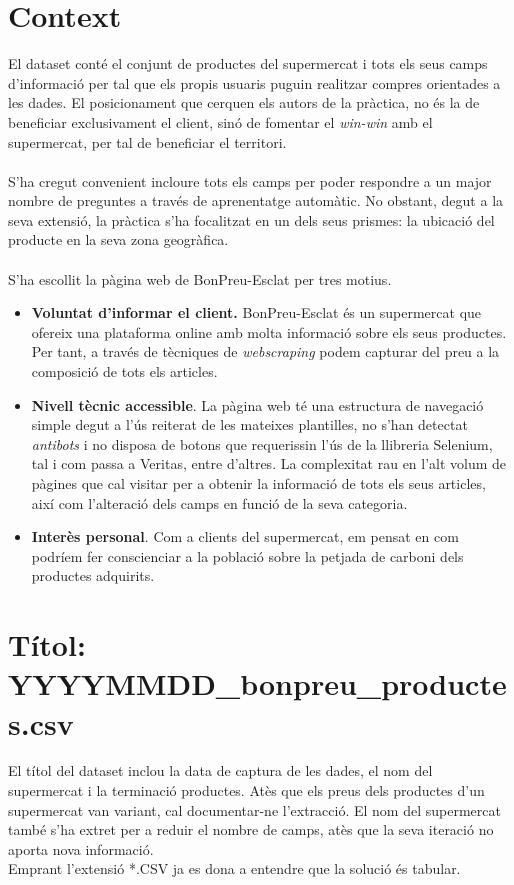 \documentclass[]{scrartcl}
\begin{document}
\section{Context}
El dataset conté el conjunt de productes del supermercat i tots els seus camps d'informació per tal que els propis usuaris puguin realitzar compres orientades a les dades. El posicionament que cerquen els autors de la pràctica, no és la de beneficiar exclusivament el client, sinó de fomentar el \textit{win-win} amb el supermercat, per tal de beneficiar el territori. 
\\\\S'ha cregut convenient incloure tots els camps per poder respondre a un major nombre de preguntes a través de aprenentatge automàtic. No obstant, degut a la seva extensió, la pràctica s'ha focalitzat en un dels seus prismes: la ubicació del producte en la seva zona geogràfica.
\\\\
S'ha escollit la pàgina web de BonPreu-Esclat per tres motius. 
\begin{itemize}
	\item \textbf{Voluntat d'informar el client.} BonPreu-Esclat és un supermercat que ofereix una plataforma online amb molta informació sobre els seus productes. Per tant, a través de tècniques de \textit{webscraping} podem capturar del preu a la composició de tots els articles.
	\item \textbf{Nivell tècnic accessible}. La pàgina web té una estructura de navegació simple degut a l'ús reiterat de les mateixes plantilles, no s'han detectat \textit{antibots} i no disposa de botons que requerissin l'ús de la llibreria Selenium, tal i com passa a Veritas, entre d'altres. La complexitat rau en l'alt volum de pàgines que cal visitar per a obtenir la informació de tots els seus articles, així com l'alteració dels camps en funció de la seva categoria.
	\item \textbf{Interès personal}. Com a clients del supermercat, em pensat en com podríem fer conscienciar a la població sobre la petjada de carboni dels productes adquirits.
\end{itemize}
\section{Títol: YYYYMMDD\_bonpreu\_productes.csv}
El títol del dataset inclou la data de captura de les dades, el nom del supermercat i la terminació productes.
Atès que els preus dels productes d'un supermercat van variant, cal documentar-ne l'extracció.
El nom del supermercat també s'ha extret per a reduir el nombre de camps, atès que la seva iteració no aporta nova informació. 
\\Emprant l'extensió *.CSV ja es dona a entendre que la solució és tabular.
\end{document}
